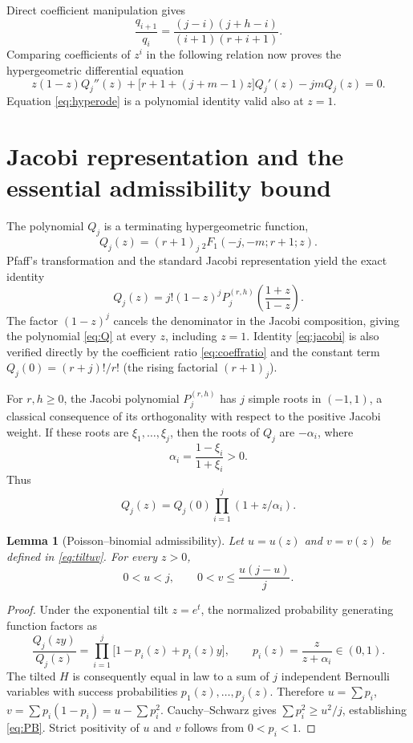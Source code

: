 \documentclass[11pt,a4paper]{article}
\newtheorem{lemma}[theorem]{Lemma}
\begin{document}
Direct coefficient manipulation gives
\begin{equation}\label{eq:coeffratio}
\frac{q_{i+1}}{q_i}=
\frac{(j-i)(j+h-i)}{(i+1)(r+i+1)}.
\end{equation}
Comparing coefficients of $z^i$ in the following relation now proves the hypergeometric differential equation
\begin{equation}\label{eq:hyperode}
 z(1-z)Q_j''(z)+
 \bigl[r+1+(j+m-1)z\bigr]Q_j'(z)-jm Q_j(z)=0.
\end{equation}
Equation \eqref{eq:hyperode} is a polynomial identity valid also at $z=1$.

\section{Jacobi representation and the essential admissibility bound}\label{sec:jacobi}
The polynomial $Q_j$ is a terminating hypergeometric function,
\[
 Q_j(z)=(r+1)_j\,{}_2F_1(-j,-m;r+1;z).
\]
Pfaff's transformation and the standard Jacobi representation yield the exact identity
\begin{equation}\label{eq:jacobi}
 \boxed{\ Q_j(z)=j!(1-z)^j
 P_j^{(r,h)}\!\left(\frac{1+z}{1-z}\right).\ }
\end{equation}
The factor $(1-z)^j$ cancels the denominator in the Jacobi composition, giving the polynomial \eqref{eq:Q} at every $z$, including $z=1$. Identity \eqref{eq:jacobi} is also verified directly by the coefficient ratio \eqref{eq:coeffratio} and the constant term $Q_j(0)=(r+j)!/r!$ (the rising factorial $(r+1)_j$).

For $r,h\ge0$, the Jacobi polynomial $P_j^{(r,h)}$ has $j$ simple roots in $(-1,1)$, a classical consequence of its orthogonality with respect to the positive Jacobi weight. If these roots are $\xi_1,\ldots,\xi_j$, then the roots of $Q_j$ are $-\alpha_i$, where
\begin{equation}\label{eq:alphas}
 \alpha_i=\frac{1-\xi_i}{1+\xi_i}>0.
\end{equation}
Thus
\begin{equation}\label{eq:factor}
 Q_j(z)=Q_j(0)\prod_{i=1}^j(1+z/\alpha_i).
\end{equation}

\begin{lemma}[Poisson--binomial admissibility]\label{lem:PB}
Let $u=u(z)$ and $v=v(z)$ be defined in \eqref{eq:tiltuv}. For every $z>0$,
\begin{equation}\label{eq:PB}
 \boxed{\quad 0<u<j,\qquad 0<v\le\frac{u(j-u)}j.\quad}
\end{equation}
\end{lemma}
\begin{proof}
Under the exponential tilt $z=e^t$, the normalized probability generating function factors as
\[
 \frac{Q_j(zy)}{Q_j(z)}=
 \prod_{i=1}^j\bigl[1-p_i(z)+p_i(z)y\bigr],
 \qquad p_i(z)=\frac{z}{z+\alpha_i}\in(0,1).
\]
The tilted $H$ is consequently equal in law to a sum of $j$ independent Bernoulli variables with success probabilities $p_1(z),\ldots,p_j(z)$. Therefore $u=\sum p_i$, $v=\sum p_i(1-p_i)=u-\sum p_i^2$. Cauchy--Schwarz gives $\sum p_i^2\ge u^2/j$, establishing \eqref{eq:PB}. Strict positivity of $u$ and $v$ follows from $0<p_i<1$.
\end{proof}
\end{document}
